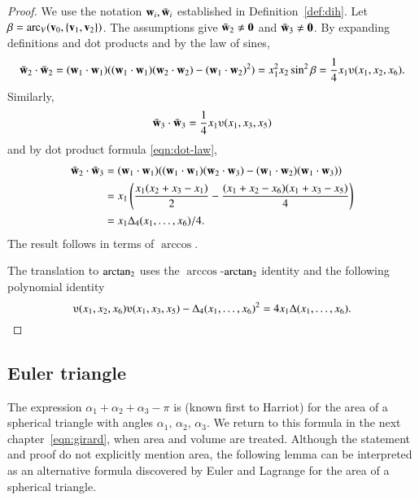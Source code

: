 \begin{proof}  We use the notation ${\mathbf w}_i, \bar {{\mathbf w}}_i$ established in Definition~\ref{def:dih}.
  Let $\beta = \operatorname{arc}_V({\mathbf v}_0,\{{\mathbf v}_1,{\mathbf v}_2\})$.  The assumptions give
  $\bar {{\mathbf w}}_2\ne {\mathbf 0}$ and $\bar {{\mathbf w}}_3 \ne {\mathbf 0}$.  %
  By expanding definitions and dot products and by the
  law of sines,
\[ 
  \bar \w_2\cdot \bar \w_2 = (\w_1\cdot \w_1) ((\w_1\cdot \w_1)(\w_2\cdot \w_2) -
  (\w_1\cdot \w_2)^2) =  x_1^2 x_2 \sin^2 \beta = \frac{1}{4}
  x_1
  \ups(x_1,x_2,x_6).
\] 
Similarly,
\[ \bar \w_3 \cdot \bar \w_3 = \frac{1}{4} x_1
  \ups(x_1,x_3,x_5)\] 
and by dot product formula \eqref{eqn:dot-law},
\begin{align*}
    \bar \w_2\cdot \bar \w_3 &= (\w_1\cdot \w_1)((\w_1\cdot \w_1)(\w_2\cdot \w_3) -
    (\w_1\cdot \w_2)(\w_1\cdot \w_3) ) \vspace{6pt} \\  
    &= x_1 \left(\frac{\displaystyle x_1 (x_2 + x_3 -
        x_1)}{2} - \frac{\displaystyle (x_1 + x_2 - x_6)(x_1 + x_3 -
        x_5)}{4} \right)\vspace{6pt}\\
&= {x_1\Delta_4(x_1,\ldots,x_6)}/{4}.
\end{align*}
The result follows in terms of $\arccos$.

The translation to ${\operatorname{arctan_2}}$ uses the $\arccos$-${\operatorname{arctan_2}}$
identity and the following polynomial
identity
\[ 
\ups(x_1,x_2,x_6)\ups(x_1,x_3,x_5) - \Delta_4(x_1,\ldots,x_6)^2
= 4 x_1 \Delta(x_1,\ldots,x_6).
\] 
\end{proof}

\subsection{Euler triangle}

The expression $\alpha_1+\alpha_2+\alpha_3-\pi$ is  (known first to Harriot) for the area of a spherical
triangle with angles $\alpha_1$, $\alpha_2$, $\alpha_3$.  We return to
this formula in the next chapter~\eqref{eqn:girard}, when area and
volume are treated.  Although the statement and proof do
not explicitly mention area, the following lemma can be interpreted
as an alternative formula discovered by Euler and Lagrange for the
area of a spherical triangle.
%
%
%
%
%

